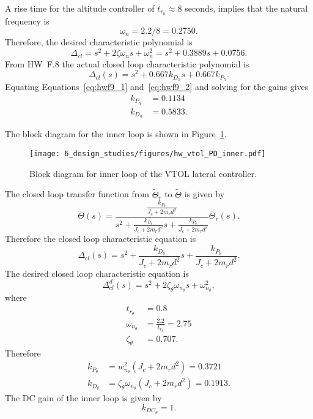 A rise time for the altitude controller of $t_{r_h}\approx 8$ seconds, implies that the natural frequency is
\[
\omega_n = 2.2/8 = 0.2750.
\]
Therefore, the desired characteristic polynomial is
\begin{equation}\label{eq:hwf9_1}
\Delta_{cl} = s^2 + 2\zeta\omega_n s + \omega_n^2 = s^2 + 0.3889 s + 0.0756.
\end{equation}
From HW~F.8 the actual closed loop characteristic polynomial is
\begin{equation}\label{eq:hwf9_2}
\Delta_{cl}(s) = s^2 + 0.667k_{D_h} s + 0.667k_{P_h}.
\end{equation}
Equating Equations~\eqref{eq:hwf9_1} and~\eqref{eq:hwf9_2} and solving for the gains gives
\begin{align*}
k_{P_h} &=  0.1134 \\
k_{D_h} &= 0.5833.
\end{align*}

The block diagram for the inner loop is shown in Figure~\ref{fig:hw_vtol_PD_inner}.
\begin{figure}[H]
   \centering
   \texttt{[image: 6\_design\_studies/figures/hw\_vtol\_PD\_inner.pdf]}
   \caption{Block diagram for inner loop of the VTOL lateral controller.}
   \label{fig:hw_vtol_PD_inner}
\end{figure}

The closed loop transfer function from $\tilde{\Theta}_r$ to $\tilde{\Theta}$ is given by
\[
\tilde{\Theta}(s) = \frac{\frac{k_{P_\theta}}{J_c+2m_rd^2}}{s^2+\frac{k_{D_\theta}}{J_c+2m_rd^2}s+\frac{k_{P_\theta}}{J_c+2m_rd^2}} \tilde{\Theta_r}(s).
\]
Therefore the closed loop characteristic equation is
\[
\Delta_{cl}(s) = s^2+\frac{k_{D_\theta}}{J_c+2m_rd^2}s+\frac{k_{P_\theta}}{J_c+2m_rd^2}.
\]
The desired closed loop characteristic equation is
\[
\Delta_{cl}^d(s) = s^2 + 2\zeta_{\theta}\omega_{n_\theta} s + \omega_{n_\theta}^2,
\]
where
\begin{align*}
t_{r_\theta} &= 0.8 \\
\omega_{n_\theta} &= \frac{2.2}{t_{r_\theta}} = 2.75 \\
\zeta_{\theta} &= 0.707.
\end{align*}
Therefore
\begin{align*}
k_{P_\theta} &= w_{n_\theta}^2(J_c+2m_rd^2) = 0.3721 \\
k_{D_\theta} &= \zeta_{\theta}\omega_{n_\theta}(J_c+2m_rd^2) = 0.1913.
\end{align*}
The DC gain of the inner loop is given by
\[
k_{DC_{\theta}} = 1.
\]

